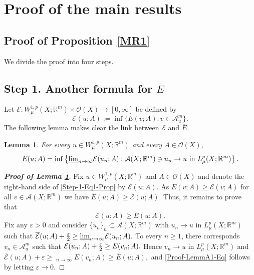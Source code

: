 \documentclass[10pt]{amsart}
\numberwithin{equation}{section}
\newtheorem{lemma}[theorem]{Lemma}
\theoremstyle{definition}
\theoremstyle{remark}
\begin{document}
\section{Proof of the main results}

\subsection{Proof of Proposition \ref{MR1}} We divide the proof into four steps.

\subsection*{Step 1. Another formula for \boldmath$\overline{E}$\unboldmath} Let $\mathcal{E}:W^ {1,p}_\mu(X;{{\mathbb R}}^m)\times\mathcal{O}(X)\to[0,\infty]$ be defined by
$$
\mathcal{E}(u;A):=\inf\Big\{E(v;A):v\in\mathcal{A}^m_u\Big\}.
$$
The following lemma makes clear the link between $\mathcal{E}$ and $\overline{E}$.
\begin{lemma}\label{Lemma1-Prop}
For every $u\in W^{1,p}_\mu(X;{{\mathbb R}}^m)$ and every $A\in\mathcal{O}(X)$,
\begin{equation}\label{Step-1-Eq1-Prop}
\overline{E}(u;A)=\inf\left\{{\mathop{\underline{\lim}}}_{n\to\infty}\mathcal{E}(u_n;A):\mathcal{A}(X;{{\mathbb R}}^m)\ni u_n\to u\hbox{ in }L^p_\mu(X;{{\mathbb R}}^m)\right\}.
\end{equation}
\end{lemma}
\begin{proof}[\bf Proof of Lemma \ref{Lemma1-Prop}]
Fix $u\in W^{1,p}_\mu(X;{{\mathbb R}}^m)$ and $A\in\mathcal{O}(X)$ and denote the right-hand side of \eqref{Step-1-Eq1-Prop} by $\overline{\mathcal{E}}(u;A)$. As $E(v;A)\geq \mathcal{E}(v;A)$ for all $v\in \mathcal{A}(X;{{\mathbb R}}^m)$ we have $\overline{E}(u;A)\geq\overline{\mathcal{E}}(u;A)$. Thus, it remains to prove that
\begin{equation}\label{Proof-LemmA1-Eq}
\overline{\mathcal{E}}(u;A)\geq \overline{E}(u;A).
\end{equation}
Fix any ${\varepsilon}>0$ and consider $\{u_n\}_n\subset \mathcal{A}(X;{{\mathbb R}}^m)$ with $u_n\to u$ in $L^p_\mu(X;{{\mathbb R}}^m)$ such that
$
\overline{\mathcal{E}}(u;A)+{{\varepsilon}\over 2}\geq{\mathop{\underline{\lim}}}_{n\to\infty}\mathcal{E}(u_n;A).
$
To every $n\geq 1$, there corresponds $v_n\in\mathcal{A}^m_u$ such that 
$
\mathcal{E}(u_n;A)+{{\varepsilon}\over 2}\geq E(v_n;A).
$
Hence $v_n\to u$ in $L^p_\mu(X;{{\mathbb R}}^m)$ and
$
\overline{\mathcal{E}}(u;A)+{\varepsilon}\geq{\mathop{\underline{\lim}}}_{n\to\infty}E(v_n;A)\geq\overline{E}(u;A),
$
and \eqref{Proof-LemmA1-Eq} follows by letting ${\varepsilon}\to0$.
\end{proof}
 
\end{document}
